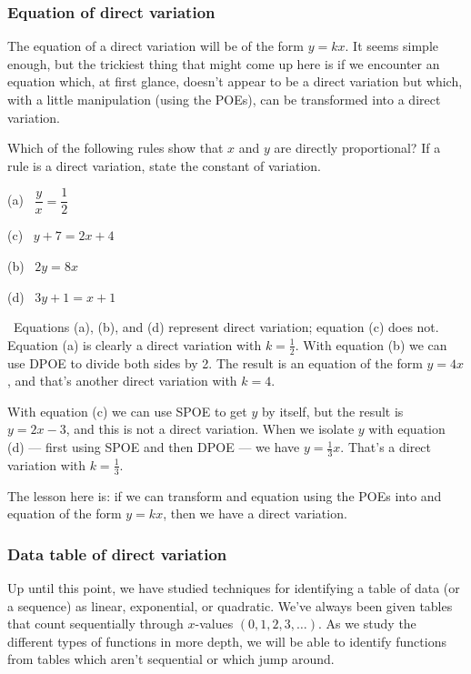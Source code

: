 \subsubsection{Equation of direct variation}

The equation of a direct variation will be of the form $y = kx$. It seems simple enough, but the trickiest thing that might come up here is if we encounter an equation which, at first glance, doesn't appear to be a direct variation but which, with a little manipulation (using the POEs), can be transformed into a direct variation.

\begin{boxex}
Which of the following rules show that $x$ and $y$ are directly proportional? If a rule is a direct variation, state the constant of variation.

\begin{center}
\begin{minipage}{0.4\linewidth}
(a)~ $\dfrac{y}{x} = \dfrac{1}{2}$

(c)~ $y + 7 = 2x + 4$
\end{minipage}
%
\begin{minipage}{0.4\linewidth}
(b)~ $2y = 8x$

(d)~ $3y + 1 = x + 1$
\end{minipage}
\end{center}

\exsoln\ Equations (a), (b), and (d) represent direct variation; equation (c) does not. Equation (a) is clearly a direct variation with $k = \frac{1}{2}$. With equation (b) we can use DPOE to divide both sides by 2. The result is an equation of the form $y=4x$, and that's another direct variation with $k=4$.

With equation (c) we can use SPOE to get $y$ by itself, but the result is $y = 2x-3$, and this is not a direct variation. When we isolate $y$ with equation (d) --- first using SPOE and then DPOE --- we have $y = \frac{1}{3}x$. That's a direct variation with $k=\frac{1}{3}$.
\end{boxex}

The lesson here is: if we can transform and equation using the POEs into and equation of the form $y = kx$, then we have a direct variation.

\subsubsection{Data table of direct variation}

Up until this point, we have studied techniques for identifying a table of data (or a sequence) as linear, exponential, or quadratic. We've always been given tables that count sequentially through $x$-values $(0, 1, 2, 3, \dotsc)$. As we study the different types of functions in more depth, we will be able to identify functions from tables which aren't sequential or which jump around.

